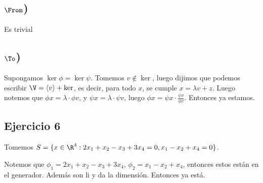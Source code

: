 \documentclass{article}
\begin{document}
\subsection*{$\From$)}
Es trivial
\subsection*{$\To$)}
Supongamos $\ker \phi = \ker \psi$. Tomemos $v \notin \ker$, luego dijimos que
podemos escribir $\V = \langle v \rangle + \ker$, es decir, para todo $x$, se
cumple $x = \lambda v + z$. Luego notemos que $\phi x = \lambda \cdot \phi v$, y
$\psi x = \lambda \cdot \psi v$, luego $\phi x = \psi x \cdot \frac{\psi
v}{\phi v} $. Entonces ya estamos.

\subsection*{Ejercicio 6}
Tomemos $S = \{x \in \R^4 : 2x_1 + x_2 - x_3+ 3x_4 = 0, x_1-x_2+x_4 = 0\}$.

Notemos que $\phi_1 = 2x_1 + x_2 - x_3+ 3x_4$, $\phi_2 = x_1-x_2+x_4$, entonces
estos están en el generador. Además son li y da la dimensión. Entonces ya está.
\end{document}

